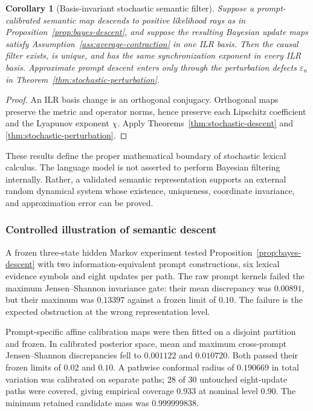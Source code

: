 \documentclass[11pt]{article}
\newtheorem{corollary}[definition]{Corollary}
\begin{document}
\begin{corollary}[Basis-invariant stochastic semantic filter]
Suppose a prompt-calibrated semantic map descends to positive likelihood rays
as in Proposition~\ref{prop:bayes-descent}, and suppose the resulting Bayesian
update maps satisfy Assumption~\ref{ass:average-contraction} in one ILR basis.
Then the causal filter exists, is unique, and has the same synchronization
exponent in every ILR basis.  Approximate prompt descent enters only through
the perturbation defects $\varepsilon_n$ in
Theorem~\ref{thm:stochastic-perturbation}.
\end{corollary}

\begin{proof}
An ILR basis change is an orthogonal conjugacy.  Orthogonal maps preserve the
metric and operator norms, hence preserve each Lipschitz coefficient and the
Lyapunov exponent $\chi$.  Apply Theorems~\ref{thm:stochastic-descent} and
\ref{thm:stochastic-perturbation}.
\end{proof}

These results define the proper mathematical boundary of stochastic lexical
calculus.  The language model is not asserted to perform Bayesian filtering
internally.  Rather, a validated semantic representation supports an external
random dynamical system whose existence, uniqueness, coordinate invariance,
and approximation error can be proved.

\subsubsection{Controlled illustration of semantic descent}
A frozen three-state hidden Markov experiment tested Proposition~\ref{prop:bayes-descent} with two information-equivalent prompt constructions, six lexical evidence symbols and eight updates per path. The raw prompt kernels failed the maximum Jensen--Shannon invariance gate: their mean discrepancy was $0.00891$, but their maximum was $0.13397$ against a frozen limit of $0.10$. The failure is the expected obstruction at the wrong representation level.

Prompt-specific affine calibration maps were then fitted on a disjoint partition and frozen. In calibrated posterior space, mean and maximum cross-prompt Jensen--Shannon discrepancies fell to $0.001122$ and $0.010720$. Both passed their frozen limits of $0.02$ and $0.10$. A pathwise conformal radius of $0.190669$ in total variation was calibrated on separate paths; 28 of 30 untouched eight-update paths were covered, giving empirical coverage $0.933$ at nominal level $0.90$. The minimum retained candidate mass was $0.999999838$.
\end{document}
